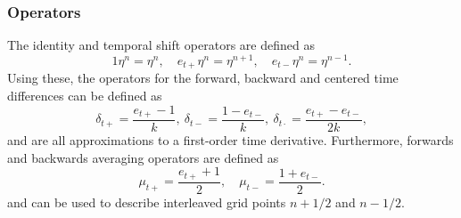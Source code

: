 \documentclass[dvipsnames, pdftex]{article}
\begin{document}
\subsubsection{Operators}
The identity and temporal shift operators are defined as
\begin{equation}
    1\eta^n = \eta^n, \quad e_{t+}\eta^n = \eta^{n+1}, \quad e_{t-}\eta^n = \eta^{n-1}.
\end{equation}
Using these, the operators for the forward, backward and centered time differences can be defined as
\begin{equation}\label{eq:discTimeOperators}
    \delta_{t+} = \frac{e_{t+} - 1}{k},\ \delta_{t-} = \frac{1 - e_{t-}}{k},\ \delta_{t\cdot} = \frac{e_{t+}-e_{t-}}{2k},
\end{equation}
and are all approximations to a first-order time derivative. Furthermore, forwards and backwards averaging operators are defined as
\begin{equation}
    \mu_{t+} = \frac{e_{t+} + 1}{2}, \quad \mu_{t-} = \frac{1 + e_{t-}}{2}.
\end{equation}
and can be used to describe interleaved grid points $n+1/2$ and $n-1/2$.
\end{document}
